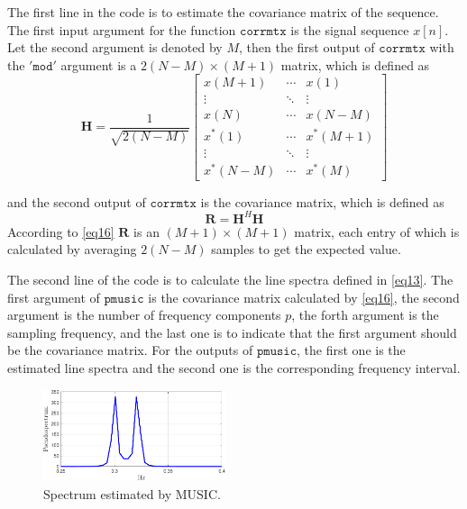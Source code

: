 \documentclass[10pt]{article}
\begin{document}
The first line in the code is to estimate the covariance matrix of 
the sequence. The first input argument for the function $\mathtt{corrmtx}$ 
is the signal sequence $x\left[n\right]$. Let the second argument is 
denoted by $M$, then the first output of $\mathtt{corrmtx}$ with the $\mathtt{'mod'}$ 
argument is a $2\left(N-M\right)\times\left(M+1\right)$ matrix, 
which is defined as 
\begin{equation}
	\mathbf{H}=\frac{1}{\sqrt{2(N-M)}} \left[\begin{matrix}
		x(M+1) & \cdots & x(1)\\
		\vdots & \ddots & \vdots\\
		x(N) & \cdots & x(N-M)\\
		x^*(1) & \cdots & x^*(M+1)\\
		\vdots & \ddots & \vdots\\
		x^*(N-M) &\cdots & x^*(M)
	\end{matrix} \right] \label{eq15}
\end{equation}

and the second output of $\mathtt{corrmtx}$ is the covariance matrix, which is defined as
\begin{equation}
	\mathbf{R}=\mathbf{H}^H\mathbf{H} \label{eq16}
\end{equation}
According to \eqref{eq16} $\mathbf{R}$ is an $\left(M+1\right)\times\left(M+1\right)$
matrix, each entry of which is calculated by averaging $2\left(N-M\right)$ 
samples to get the expected value. 

The second line of the code is to calculate the line spectra defined 
in \eqref{eq13}. The first argument of $\mathtt{pmusic}$ is the covariance matrix calculated 
by \eqref{eq16}, the second argument is the number of frequency components $p$, 
the forth argument is the sampling frequency, and the last one is to 
indicate that the first argument should be the covariance matrix. For 
the outputs of $\mathtt{pmusic}$, the first one is the estimated line 
spectra and the second one is the corresponding frequency interval. 

\begin{figure}[htbp]
	\centering
	\includegraphics[width=0.48\textwidth]{fig/1.3_6.pdf}
	\caption{Spectrum estimated by MUSIC.}
	\label{fig7}
\end{figure}
\end{document}
